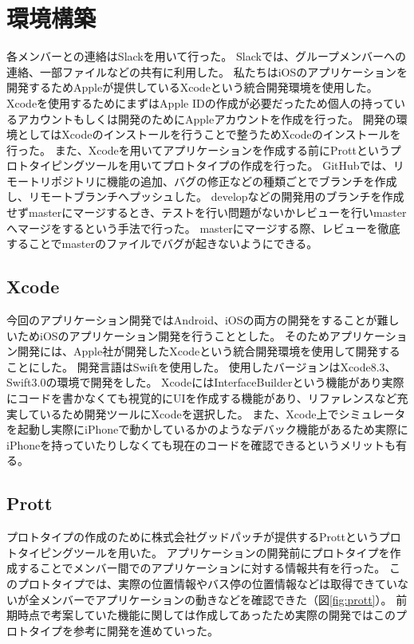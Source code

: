 \documentclass[openany,11pt,papersize]{jsbook}
\begin{document}
\section{環境構築}
各メンバーとの連絡はSlackを用いて行った。
Slackでは、グループメンバーへの連絡、一部ファイルなどの共有に利用した。
私たちはiOSのアプリケーションを開発するためAppleが提供しているXcodeという統合開発環境を使用した。
Xcodeを使用するためにまずはApple IDの作成が必要だったため個人の持っているアカウントもしくは開発のためにAppleアカウントを作成を行った。
開発の環境としてはXcodeのインストールを行うことで整うためXcodeのインストールを行った。
また、Xcodeを用いてアプリケーションを作成する前にProttというプロトタイピングツールを用いてプロトタイプの作成を行った。
GitHubでは、リモートリポジトリに機能の追加、バグの修正などの種類ごとでブランチを作成し、リモートブランチへプッシュした。
developなどの開発用のブランチを作成せずmasterにマージするとき、テストを行い問題がないかレビューを行いmasterへマージをするという手法で行った。
masterにマージする際、レビューを徹底することでmasterのファイルでバグが起きないようにできる。


\subsection{Xcode}
今回のアプリケーション開発ではAndroid、iOSの両方の開発をすることが難しいためiOSのアプリケーション開発を行うこととした。
そのためアプリケーション開発には、Apple社が開発したXcodeという統合開発環境を使用して開発することにした\cite{Apple}。
開発言語はSwiftを使用した。
使用したバージョンはXcode8.3、Swift3.0の環境で開発をした。
XcodeにはInterfaceBuilderという機能があり実際にコードを書かなくても視覚的にUIを作成する機能があり、リファレンスなど充実しているため開発ツールにXcodeを選択した。
また、Xcode上でシミュレータを起動し実際にiPhoneで動かしているかのようなデバック機能があるため実際にiPhoneを持っていたりしなくても現在のコードを確認できるというメリットも有る。


\subsection{Prott}
プロトタイプの作成のために株式会社グッドパッチが提供するProttというプロトタイピングツールを用いた\cite{Prott}。
アプリケーションの開発前にプロトタイプを作成することでメンバー間でのアプリケーションに対する情報共有を行った。
このプロトタイプでは、実際の位置情報やバス停の位置情報などは取得できていないが全メンバーでアプリケーションの動きなどを確認できた（図\ref{fig:prott}）。
前期時点で考案していた機能に関しては作成してあったため実際の開発ではこのプロトタイプを参考に開発を進めていった。
\end{document}
